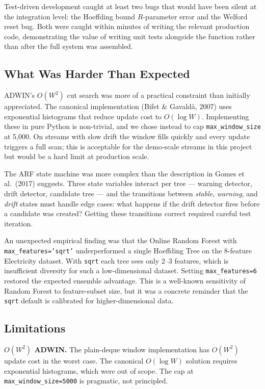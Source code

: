 \documentclass[10pt,a4paper]{article}
\begin{document}
Test-driven development caught at least two bugs that would have been silent at the integration level: the Hoeffding bound $R$-parameter error and the Welford reset bug. Both were caught within minutes of writing the relevant production code, demonstrating the value of writing unit tests alongside the function rather than after the full system was assembled.

\subsection{What Was Harder Than Expected}

ADWIN's $O(W^2)$ cut search was more of a practical constraint than initially appreciated. The canonical implementation (Bifet \& Gavaldà, 2007) uses exponential histograms that reduce update cost to $O(\log W)$. Implementing these in pure Python is non-trivial, and we chose instead to cap \texttt{max\_window\_size} at 5{,}000. On streams with slow drift the window fills quickly and every update triggers a full scan; this is acceptable for the demo-scale streams in this project but would be a hard limit at production scale.

The ARF state machine was more complex than the description in Gomes et al.\ (2017) suggests. Three state variables interact per tree --- warning detector, drift detector, candidate tree --- and the transitions between \emph{stable}, \emph{warning}, and \emph{drift} states must handle edge cases: what happens if the drift detector fires before a candidate was created? Getting these transitions correct required careful test iteration.

An unexpected empirical finding was that the Online Random Forest with \texttt{max\_features='sqrt'} underperformed a single Hoeffding Tree on the 8-feature Electricity dataset. With \texttt{sqrt} each tree sees only 2--3 features, which is insufficient diversity for such a low-dimensional dataset. Setting \texttt{max\_features=6} restored the expected ensemble advantage. This is a well-known sensitivity of Random Forest to feature-subset size, but it was a concrete reminder that the \texttt{sqrt} default is calibrated for higher-dimensional data.

\subsection{Limitations}

\textbf{$O(W^2)$ ADWIN.} The plain-deque window implementation has $O(W^2)$ update cost in the worst case. The canonical $O(\log W)$ solution requires exponential histograms, which were out of scope. The cap at \texttt{max\_window\_size=5000} is pragmatic, not principled.
\end{document}
